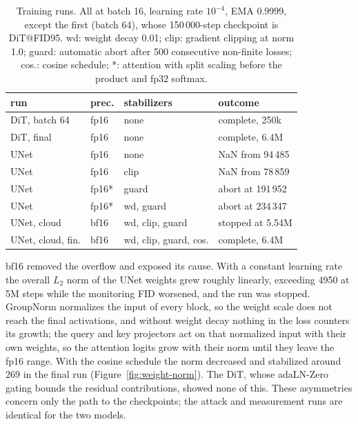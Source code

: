 \documentclass{article}
\begin{document}
\begin{table}[H]
  \caption{Training runs. All at batch 16, learning rate $10^{-4}$, EMA 0.9999, except the first (batch 64), whose 150\,000-step checkpoint is DiT@FID95. wd: weight decay 0.01; clip: gradient clipping at norm 1.0; guard: automatic abort after 500 consecutive non-finite losses; cos.: cosine schedule; *: attention with split scaling before the product and fp32 softmax.}
  \label{tab:runs}
  \centering
  \begin{footnotesize}
    \setlength{\tabcolsep}{2pt}
    \begin{tabular}{llll}
      \toprule
      run & prec. & stabilizers & outcome \\
      \midrule
      DiT, batch 64 & fp16 & none & complete, 250k \\
      DiT, final & fp16 & none & complete, 6.4M \\
      UNet & fp16 & none & NaN from 94\,485 \\
      UNet & fp16 & clip & NaN from 78\,859 \\
      UNet & fp16* & guard & abort at 191\,952 \\
      UNet & fp16* & wd, guard & abort at 234\,347 \\
      UNet, cloud & bf16 & wd, clip, guard & stopped at 5.54M \\
      UNet, cloud, fin. & bf16 & wd, clip, guard, cos. & complete, 6.4M \\
      \bottomrule
    \end{tabular}
  \end{footnotesize}
  \vspace{-0.3cm}
\end{table}

bf16 removed the overflow and exposed its cause. With a constant learning rate the overall $L_2$ norm of the UNet weights grew roughly linearly, exceeding 4950 at 5M steps while the monitoring FID worsened, and the run was stopped. GroupNorm normalizes the input of every block, so the weight scale does not reach the final activations, and without weight decay nothing in the loss counters its growth; the query and key projectors act on that normalized input with their own weights, so the attention logits grow with their norm until they leave the fp16 range. With the cosine schedule the norm decreased and stabilized around 269 in the final run (Figure~\ref{fig:weight-norm}). The DiT, whose adaLN-Zero gating bounds the residual contributions, showed none of this. These asymmetries concern only the path to the checkpoints; the attack and measurement runs are identical for the two models.
\end{document}
